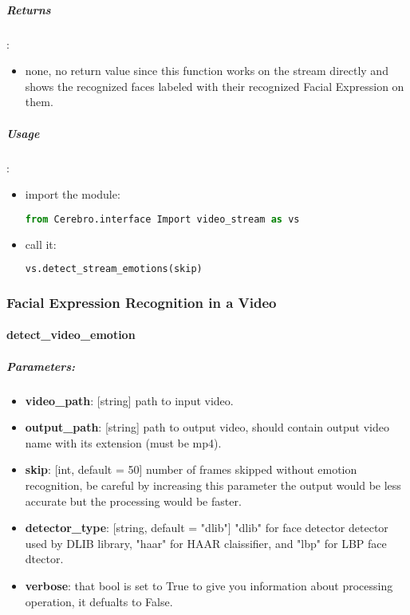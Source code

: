 \subparagraph{Returns}:
\begin{changemargin}{0.5cm}{0cm}
\begin{itemize}[noitemsep,nolistsep]
	\item none, no return value since this function works on the stream directly and shows the recognized faces labeled with their recognized Facial Expression on them.
\end{itemize}
\end{changemargin}
	
\subparagraph{Usage}:
\begin{changemargin}{0.5cm}{0cm}
\begin{itemize}
	\item import the module:
	\begin{lstlisting}[language=Python]
	from Cerebro.interface Import video_stream as vs\end{lstlisting}
	\item call it:
	\begin{lstlisting}[language=Python]
	vs.detect_stream_emotions(skip)\end{lstlisting}
\end{itemize}
\end{changemargin}



\subsubsection{Facial Expression Recognition in a Video}
\paragraph{detect\_video\_emotion}
\subparagraph{Parameters:}
\begin{changemargin}{0.5cm}{0cm} 
	\begin{itemize}
		\item  \textbf{video\_path}: [string] path to input video.
		\item  \textbf{output\_path}: [string] path to output video, should contain output video name with its extension (must be mp4).
		\item  \textbf{skip}: [int, default = 50] number of frames skipped without emotion recognition, be careful by increasing this parameter the output would be less accurate but the processing would be faster.
		\item \textbf{detector\_type}: [string, default = "dlib"] "dlib" for face detector detector used by DLIB library, "haar" for HAAR claissifier, and "lbp" for LBP face dtector.
		\item  \textbf{verbose}: that bool is set to True to give you information about processing operation, it defualts to False.
	\end{itemize}
\end{changemargin}

